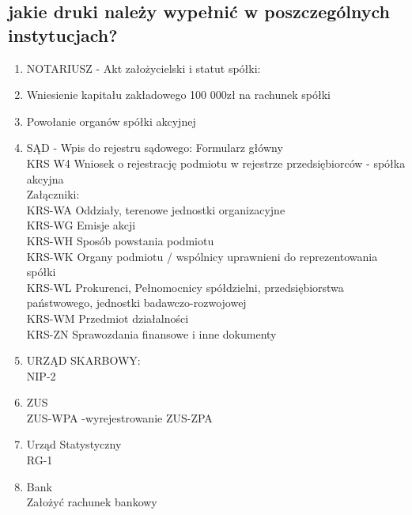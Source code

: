 \documentclass[a4paper, 11pt]{article}
\begin{document}
\subsection{jakie druki należy wypełnić w poszczególnych instytucjach?}
\begin{enumerate}
\item NOTARIUSZ - Akt założycielski i statut spółki:
	
\item Wniesienie kapitału zakładowego 100 000zł na rachunek spółki
\item Powołanie organów spółki akcyjnej
\item SĄD - Wpis do rejestru sądowego: 
Formularz główny\\
KRS W4 	Wniosek o rejestrację podmiotu w rejestrze przedsiębiorców - spółka akcyjna\\
Załączniki:\\
KRS-WA Oddziały, terenowe jednostki organizacyjne\\
KRS-WG 	Emisje akcji\\
KRS-WH Sposób powstania podmiotu\\
KRS-WK Organy podmiotu / wspólnicy uprawnieni do reprezentowania spółki\\
KRS-WL 	Prokurenci, Pełnomocnicy spółdzielni, przedsiębiorstwa państwowego, jednostki badawczo-rozwojowej\\
KRS-WM Przedmiot działalności\\
KRS-ZN Sprawozdania finansowe i inne dokumenty\\

\item URZĄD SKARBOWY:\\
	NIP-2
\item ZUS\\
 ZUS-WPA -wyrejestrowanie
	ZUS-ZPA
\item Urząd Statystyczny\\
	RG-1
\item Bank\\
	Założyć rachunek bankowy
\end{enumerate}
\end{document}
